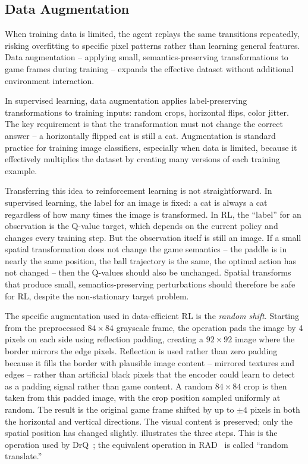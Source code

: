\subsection{Data Augmentation}
\label{subsec:data-augmentation}

When training data is limited, the agent replays the same transitions
repeatedly, risking overfitting to specific pixel patterns rather than
learning general features. Data augmentation -- applying small,
semantics-preserving transformations to game frames during training --
expands the effective dataset without additional environment interaction.

\smallskip
In supervised learning, data augmentation applies label-preserving
transformations to training inputs: random crops, horizontal flips,
color jitter. The key requirement is that the transformation must
not change the correct answer -- a horizontally flipped cat is
still a cat. Augmentation is standard practice for training image
classifiers, especially when data is limited, because it
effectively multiplies the dataset by creating many versions of
each training example.

\smallskip
Transferring this idea to reinforcement learning is not
straightforward. In supervised learning, the label for an image is
fixed: a cat is always a cat regardless of how many times the image
is transformed. In RL, the ``label'' for an observation is the
Q-value target, which depends on the current policy and changes
every training step. But the observation itself is still an image.
If a small spatial transformation does not change the game
semantics -- the paddle is in nearly the same position, the ball
trajectory is the same, the optimal action has not changed -- then
the Q-values should also be unchanged. Spatial transforms that
produce small, semantics-preserving perturbations should therefore
be safe for RL, despite the non-stationary target problem.

\smallskip
The specific augmentation used in data-efficient RL is the
\emph{random shift}. Starting from the preprocessed
$84 \times 84$ grayscale frame, the operation pads the image by 4
pixels on each side using reflection padding, creating a
$92 \times 92$ image where the border mirrors the edge pixels.
Reflection is used rather than zero padding because it fills the
border with plausible image content -- mirrored textures and edges
-- rather than artificial black pixels that the encoder could learn
to detect as a padding signal rather than game content. A
random $84 \times 84$ crop is then taken from this padded image,
with the crop position sampled uniformly at random. The result is
the original game frame shifted by up to $\pm 4$ pixels in both the
horizontal and vertical directions. The visual content is preserved;
only the spatial position has changed slightly.
 illustrates the three steps. This is the
operation used by DrQ~\citep{kostrikov2020image}; the equivalent
operation in RAD~\citep{laskin2020reinforcement} is called ``random
translate.''

